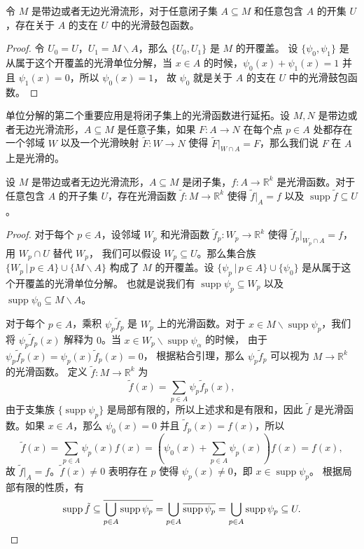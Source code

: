 \documentclass[fontset=none]{Notes}
\DeclareMathOperator\supp{supp}
\begin{document}
\begin{proposition}[光滑鼓包函数的存在性]
  令 $M$ 是带边或者无边光滑流形，对于任意闭子集 $A\subseteq M$ 和任意包含
  $A$ 的开集 $U$，存在关于 $A$ 的支在 $U$ 中的光滑鼓包函数。
\end{proposition}
\begin{proof}
  令 $U_0=U$，$U_1=M\smallsetminus A$，那么 $\{U_0,U_1\}$ 是 $M$ 的开覆盖。
  设 $\{\psi_0,\psi_1\}$ 是从属于这个开覆盖的光滑单位分解，当 $x\in A$
  的时候，$\psi_0(x)+\psi_1(x)=1$ 并且 $\psi_1(x)=0$，所以 $\psi_0(x)=1$，
  故 $\psi_0$ 就是关于 $A$ 的支在 $U$ 中的光滑鼓包函数。
\end{proof}

单位分解的第二个重要应用是将闭子集上的光滑函数进行延拓。设 $M,N$
是带边或者无边光滑流形，$A\subseteq M$ 是任意子集，如果 $F:A\to N$
在每个点 $p\in A$ 处都存在一个邻域 $W$ 以及一个光滑映射 $\tilde{F}:W\to N$
使得 $\tilde{F}\big|_{W\cap A}=F$，那么我们说 $F$ 在 $A$ 上是光滑的。

\begin{lemma}[光滑函数的延拓引理]\label{lemma:extension for smooth map}
  设 $M$ 是带边或者无边光滑流形，$A\subseteq M$ 是闭子集，$f:A\to\mathbb{R}^k$
  是光滑函数。对于任意包含 $A$ 的开子集 $U$，存在光滑函数 $\tilde{f}:M\to\mathbb{R}^k$
  使得 $\tilde{f}\big|_A=f$ 以及 $\supp\tilde{f}\subseteq U$。
\end{lemma}
\begin{proof}
  对于每个 $p\in A$，设邻域 $W_p$ 和光滑函数 $\tilde{f}_p:W_p\to\mathbb{R}^k$
  使得 $\tilde{f}_p\big|_{W_p\cap A}=f$，用 $W_p\cap U$ 替代 $W_p$，
  我们可以假设 $W_p\subseteq U$。那么集合族 $\{W_p\,|\,p\in A\}\cup\{M\smallsetminus A\}$
  构成了 $M$ 的开覆盖。设 $\{\psi_p\,|\, p\in A\}\cup\{\psi_0\}$ 是从属于这个开覆盖的光滑单位分解。
  也就是说我们有 $\supp\psi_p\subseteq W_p$ 以及 $\supp\psi_0\subseteq M\smallsetminus A$。

  对于每个 $p\in A$，乘积 $\psi_p\tilde{f}_p$ 是 $W_p$ 上的光滑函数。对于
  $x\in M\smallsetminus \supp\psi_p$，我们将 $\psi_p\tilde{f}_p(x)$ 解释为
  $0$。当 $x\in W_p\smallsetminus \supp\psi_\alpha$ 的时候，
  由于 $\psi_p\tilde{f}_p(x)=\psi_p(x)\tilde{f}_p(x)=0$，
  根据粘合引理，那么 $\psi_p\tilde{f}_p$ 可以视为 $M\to\mathbb{R}^k$ 的光滑函数。
  定义 $\tilde{f}:M\to\mathbb{R}^k$ 为
  \[
    \tilde{f}(x)=\sum_{p\in A}\psi_p\tilde{f}_p(x),  
  \]
  由于支集族 $\{\supp\psi_p\}$ 是局部有限的，所以上述求和是有限和，因此 $\tilde{f}$
  是光滑函数。如果 $x\in A$，那么 $\psi_0(x)=0$ 并且 $\tilde{f}_p(x)=f(x)$，所以
  \[
    \tilde{f}(x)=\sum_{p\in A}\psi_p(x)f(x)=\left(
      \psi_0(x)+\sum_{p\in A}\psi_p(x)
    \right)f(x)=f(x),
  \]
  故 $\tilde{f}\big|_A=f$。$\tilde{f}(x)\neq 0$ 表明存在 $p$ 使得
  $\psi_p(x)\neq 0$，即 $x\in \supp\psi_p$。
  根据局部有限的性质，有
  \[
    \supp\tilde{f}\subseteq\overline{\bigcup_{p\in A}\supp\psi_p}=
    \bigcup_{p\in A}\overline{\supp\psi_p}=\bigcup_{p\in A}\supp\psi_p\subseteq U.\qedhere
  \]
\end{proof}
\end{document}
